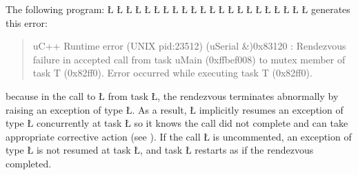\documentclass[openright,twoside]{report}
\begin{document}
The following program:
\LGinlinefalse\LGbegin\lgrinde
\L{}
\L{\LB{}}
\L{}
\L{\LB{}}
\L{}
\L{\LB{}}
\L{\LB{}}
\L{\LB{\C{}\1\1}}
\CE{}\L{\LB{}}
\L{\LB{}}
\L{}
\L{\LB{}}
\L{\LB{}}
\L{\LB{}}
\L{\LB{\};}}
\endlgrinde\LGend
\LGinlinefalse\LGbegin\lgrinde
\L{}
\L{\LB{}}
\L{\LB{}}
\L{\LB{}}
\L{\LB{}}
\L{\LB{}}
\L{\LB{\}}}
\endlgrinde\LGend
generates this error:
\begin{quote}
\BGfont
uC++ Runtime error (UNIX pid:23512) (uSerial \&)0x83120 : Rendezvous failure in accepted call from task uMain (0xffbef008) to mutex member of task T (0x82ff0).
Error occurred while executing task T (0x82ff0).
\end{quote}
because in the call to \LGinlinetrue\LGbegin\lgrinde\L{}\endlgrinde\LGend{} from task \LGinlinetrue\LGbegin\lgrinde\L{}\endlgrinde\LGend{}, the rendezvous terminates abnormally by raising an exception of type \LGinlinetrue\LGbegin\lgrinde\L{}\endlgrinde\LGend{}.
As a result, \LGinlinetrue\LGbegin\lgrinde\L{}\endlgrinde\LGend{} implicitly resumes an exception of type \LGinlinetrue\LGbegin\lgrinde\L{}\endlgrinde\LGend{} concurrently at task \LGinlinetrue\LGbegin\lgrinde\L{}\endlgrinde\LGend{} so it knows the call did not complete and can take appropriate corrective action (see ).
If the call \LGinlinetrue\LGbegin\lgrinde\L{}\endlgrinde\LGend{} is uncommented, an exception of type \LGinlinetrue\LGbegin\lgrinde\L{}\endlgrinde\LGend{} is not resumed at task \LGinlinetrue\LGbegin\lgrinde\L{}\endlgrinde\LGend{}, and task \LGinlinetrue\LGbegin\lgrinde\L{}\endlgrinde\LGend{} restarts as if the rendezvous completed.
\end{document}
